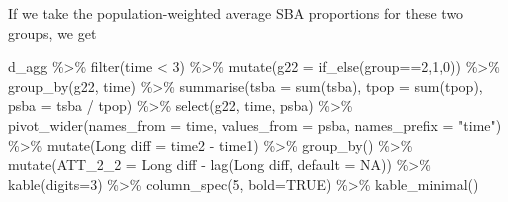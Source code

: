 \documentclass[
]{article}
\newenvironment{Shaded}{\begin{snugshade}}{\end{snugshade}}
\newcommand{\AttributeTok}[1]{\textcolor[rgb]{0.77,0.63,0.00}{#1}}
\newcommand{\ConstantTok}[1]{\textcolor[rgb]{0.00,0.00,0.00}{#1}}
\newcommand{\DecValTok}[1]{\textcolor[rgb]{0.00,0.00,0.81}{#1}}
\newcommand{\FunctionTok}[1]{\textcolor[rgb]{0.00,0.00,0.00}{#1}}
\newcommand{\NormalTok}[1]{#1}
\newcommand{\OtherTok}[1]{\textcolor[rgb]{0.56,0.35,0.01}{#1}}
\newcommand{\SpecialCharTok}[1]{\textcolor[rgb]{0.00,0.00,0.00}{#1}}
\newcommand{\StringTok}[1]{\textcolor[rgb]{0.31,0.60,0.02}{#1}}
\begin{document}
If we take the population-weighted average SBA proportions for these two
groups, we get

\begin{Shaded}
\begin{Highlighting}[]
\NormalTok{d\_agg }\SpecialCharTok{\%\textgreater{}\%} \FunctionTok{filter}\NormalTok{(time }\SpecialCharTok{\textless{}} \DecValTok{3}\NormalTok{) }\SpecialCharTok{\%\textgreater{}\%}
  \FunctionTok{mutate}\NormalTok{(}\AttributeTok{g22 =} \FunctionTok{if\_else}\NormalTok{(group}\SpecialCharTok{==}\DecValTok{2}\NormalTok{,}\DecValTok{1}\NormalTok{,}\DecValTok{0}\NormalTok{)) }\SpecialCharTok{\%\textgreater{}\%}
  \FunctionTok{group\_by}\NormalTok{(g22, time) }\SpecialCharTok{\%\textgreater{}\%}
  \FunctionTok{summarise}\NormalTok{(}\AttributeTok{tsba =} \FunctionTok{sum}\NormalTok{(tsba),}
            \AttributeTok{tpop =} \FunctionTok{sum}\NormalTok{(tpop),}
            \AttributeTok{psba =}\NormalTok{ tsba }\SpecialCharTok{/}\NormalTok{ tpop) }\SpecialCharTok{\%\textgreater{}\%}
  \FunctionTok{select}\NormalTok{(g22, time, psba) }\SpecialCharTok{\%\textgreater{}\%}
  \FunctionTok{pivot\_wider}\NormalTok{(}\AttributeTok{names\_from =}\NormalTok{ time, }\AttributeTok{values\_from =}\NormalTok{ psba,}
              \AttributeTok{names\_prefix =} \StringTok{"time"}\NormalTok{) }\SpecialCharTok{\%\textgreater{}\%}
  \FunctionTok{mutate}\NormalTok{(}\StringTok{\textasciigrave{}}\AttributeTok{Long diff}\StringTok{\textasciigrave{}} \OtherTok{=} \StringTok{\textasciigrave{}}\AttributeTok{time2}\StringTok{\textasciigrave{}} \SpecialCharTok{{-}} \StringTok{\textasciigrave{}}\AttributeTok{time1}\StringTok{\textasciigrave{}}\NormalTok{) }\SpecialCharTok{\%\textgreater{}\%}
  \FunctionTok{group\_by}\NormalTok{() }\SpecialCharTok{\%\textgreater{}\%}
  \FunctionTok{mutate}\NormalTok{(}\AttributeTok{ATT\_2\_2 =} \StringTok{\textasciigrave{}}\AttributeTok{Long diff}\StringTok{\textasciigrave{}} \SpecialCharTok{{-}} \FunctionTok{lag}\NormalTok{(}\StringTok{\textasciigrave{}}\AttributeTok{Long diff}\StringTok{\textasciigrave{}}\NormalTok{, }\AttributeTok{default =} \ConstantTok{NA}\NormalTok{)) }\SpecialCharTok{\%\textgreater{}\%}
  \FunctionTok{kable}\NormalTok{(}\AttributeTok{digits=}\DecValTok{3}\NormalTok{) }\SpecialCharTok{\%\textgreater{}\%}
  \FunctionTok{column\_spec}\NormalTok{(}\DecValTok{5}\NormalTok{, }\AttributeTok{bold=}\ConstantTok{TRUE}\NormalTok{) }\SpecialCharTok{\%\textgreater{}\%}
  \FunctionTok{kable\_minimal}\NormalTok{()}
\end{Highlighting}
\end{Shaded}
\end{document}
